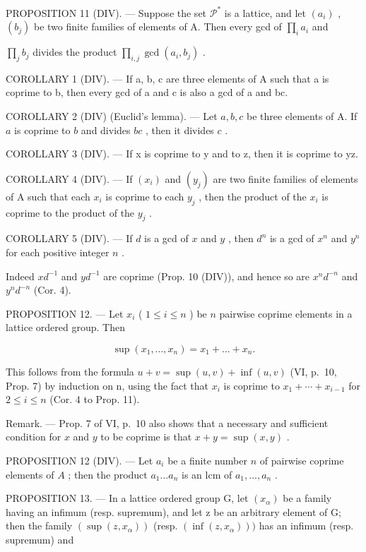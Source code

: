 PROPOSITION 11 (DIV). --- Suppose the set \(\mathcal{P}^*\) is a lattice, and let \((a_i)\) , \((b_j)\) be two finite families of elements of A. Then every gcd of \(\prod_{i} a_i\) and

\(\prod_{j} b_{j}\) divides the product \(\prod_{i,j} \gcd(a_{i}, b_{j})\) .

COROLLARY 1 (DIV). --- If a, b, c are three elements of A such that a is coprime to b, then every gcd of a and c is also a gcd of a and bc.

COROLLARY 2 (DIV) (Euclid's lemma). --- Let \(a, b, c\) be three elements of A. If \(a\) is coprime to \(b\) and divides \(bc\) , then it divides \(c\) .

COROLLARY 3 (DIV). --- If x is coprime to y and to z, then it is coprime to yz.

COROLLARY 4 (DIV). --- If \((x_{i})\) and \((y_{j})\) are two finite families of elements of A such that each \(x_{i}\) is coprime to each \(y_{j}\) , then the product of the \(x_{i}\) is coprime to the product of the \(y_{j}\) .

COROLLARY 5 (DIV). --- If \(d\) is a gcd of \(x\) and \(y\) , then \(d^n\) is a gcd of \(x^n\) and \(y^n\) for each positive integer \(n\) .

Indeed \(xd^{-1}\) and \(yd^{-1}\) are coprime (Prop. 10 (DIV)), and hence so are \(x^{n}d^{-n}\) and \(y^{n}d^{-n}\) (Cor. 4).

PROPOSITION 12. --- Let \(x_{i}\) ( \(1 \leqslant i \leqslant n\) ) be \(n\) pairwise coprime elements in a lattice ordered group. Then

\[
\sup \left(x _ {1}, \dots , x _ {n}\right) = x _ {1} + \dots + x _ {n}.
\]

This follows from the formula \(u + v = \sup(u, v) + \inf(u, v)\) (VI, p.~10, Prop. 7) by induction on n, using the fact that \(x_{i}\) is coprime to \(x_{1} + \cdots + x_{i-1}\) for \(2 \leqslant i \leqslant n\) (Cor. 4 to Prop. 11).

Remark. --- Prop. 7 of VI, p.~10 also shows that a necessary and sufficient condition for \(x\) and \(y\) to be coprime is that \(x + y = \sup(x, y)\) .

PROPOSITION 12 (DIV). --- Let \(a_i\) be a finite number \(n\) of pairwise coprime elements of \(A\) ; then the product \(a_1 \ldots a_n\) is an lcm of \(a_1, \ldots, a_n\) .

PROPOSITION 13. --- In a lattice ordered group G, let \((x_{\alpha})\) be a family having an infimum (resp. supremum), and let z be an arbitrary element of G; then the family \((\sup(z, x_{\alpha}))\) (resp. \((\inf(z, x_{\alpha})))\) has an infimum (resp. supremum) and

